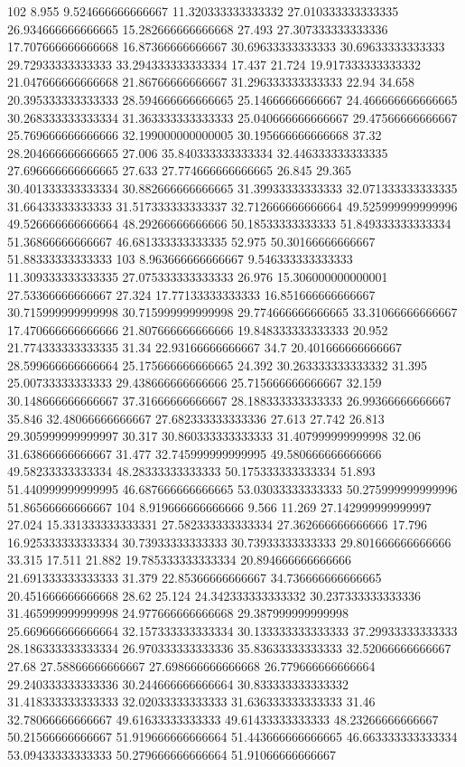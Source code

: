 102 8.955 9.524666666666667 11.320333333333332 27.010333333333335 26.934666666666665 15.282666666666668 27.493 27.307333333333336 17.707666666666668 16.87366666666667 30.69633333333333 30.69633333333333 29.72933333333333 33.294333333333334 17.437 21.724 19.917333333333332 21.047666666666668 21.86766666666667 31.296333333333333 22.94 34.658 20.395333333333333 28.594666666666665 25.14666666666667 24.466666666666665 30.268333333333334 31.363333333333333 25.040666666666667 29.47566666666667 25.769666666666666 32.199000000000005 30.195666666666668 37.32 28.204666666666665 27.006 35.840333333333334 32.446333333333335 27.696666666666665 27.633 27.774666666666665 26.845 29.365 30.401333333333334 30.882666666666665 31.39933333333333 32.071333333333335 31.66433333333333 31.517333333333337 32.712666666666664 49.525999999999996 49.526666666666664 48.29266666666666 50.18533333333333 51.849333333333334 51.36866666666667 46.681333333333335 52.975 50.30166666666667 51.88333333333333
103 8.963666666666667 9.546333333333333 11.309333333333335 27.075333333333333 26.976 15.306000000000001 27.53366666666667 27.324 17.77133333333333 16.851666666666667 30.715999999999998 30.715999999999998 29.774666666666665 33.31066666666667 17.470666666666666 21.807666666666666 19.848333333333333 20.952 21.774333333333335 31.34 22.93166666666667 34.7 20.401666666666667 28.599666666666664 25.175666666666665 24.392 30.263333333333332 31.395 25.00733333333333 29.438666666666666 25.715666666666667 32.159 30.148666666666667 37.31666666666667 28.188333333333333 26.99366666666667 35.846 32.48066666666667 27.682333333333336 27.613 27.742 26.813 29.305999999999997 30.317 30.860333333333333 31.407999999999998 32.06 31.63866666666667 31.477 32.745999999999995 49.580666666666666 49.58233333333334 48.28333333333333 50.175333333333334 51.893 51.440999999999995 46.687666666666665 53.03033333333333 50.275999999999996 51.86566666666667
104 8.919666666666666 9.566 11.269 27.142999999999997 27.024 15.331333333333331 27.582333333333334 27.362666666666666 17.796 16.925333333333334 30.73933333333333 30.73933333333333 29.801666666666666 33.315 17.511 21.882 19.785333333333334 20.894666666666666 21.691333333333333 31.379 22.85366666666667 34.736666666666665 20.451666666666668 28.62 25.124 24.342333333333332 30.237333333333336 31.465999999999998 24.977666666666668 29.387999999999998 25.669666666666664 32.157333333333334 30.133333333333333 37.29933333333333 28.186333333333334 26.970333333333336 35.83633333333333 32.52066666666667 27.68 27.58866666666667 27.698666666666668 26.779666666666664 29.240333333333336 30.244666666666664 30.833333333333332 31.418333333333333 32.02033333333333 31.636333333333333 31.46 32.78066666666667 49.61633333333333 49.61433333333333 48.23266666666667 50.21566666666667 51.919666666666664 51.443666666666665 46.663333333333334 53.09433333333333 50.279666666666664 51.91066666666667
